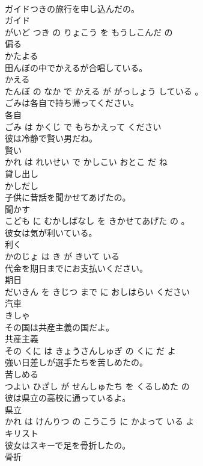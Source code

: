 \documentclass[8pt]{extreport}
\begin{document}
\begin{CJK}{UTF8}{min}
\\	ガイドつきの旅行を申し込んだの。	
\\	ガイド 
\\	がいど つき の りょこう を もうしこんだ の			
\\	偏る	
\\	かたよる			
\\	田んぼの中でかえるが合唱している。	
\\	かえる 
\\	たんぼ の なか で かえる が がっしょう している 。			
\\	ごみは各自で持ち帰ってください。	
\\	各自 
\\	ごみ は かくじ で もちかえって ください			
\\	彼は冷静で賢い男だね。	
\\	賢い 
\\	かれ は れいせい で かしこい おとこ だ ね			
\\	貸し出し	
\\	かしだし			
\\	子供に昔話を聞かせてあげたの。	
\\	聞かす 
\\	こども に むかしばなし を きかせてあげた の 。			
\\	彼女は気が利いている。	
\\	利く 
\\	かのじょ は き が きいて いる			
\\	代金を期日までにお支払いください。	
\\	期日 
\\	だいきん を きじつ まで に おしはらい ください			
\\	汽車	
\\	きしゃ			
\\	その国は共産主義の国だよ。	
\\	共産主義 
\\	その くに は きょうさんしゅぎ の くに だ よ			
\\	強い日差しが選手たちを苦しめたの。	
\\	苦しめる 
\\	つよい ひざし が せんしゅたち を くるしめた の			
\\	彼は県立の高校に通っているよ。	
\\	県立 
\\	かれ は けんりつ の こうこう に かよって いる よ			
\\	キリスト	
\\	彼女はスキーで足を骨折したの。	
\\	骨折 

\end{CJK}
\end{document}
